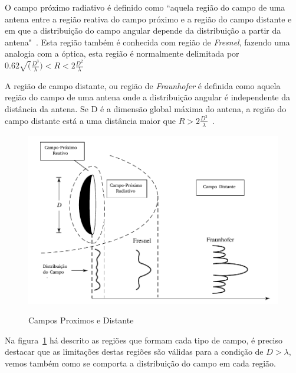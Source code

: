 O campo próximo radiativo é definido como “aquela região do campo de uma antena entre a região reativa do campo próximo e a região do campo distante e em que a distribuição do campo angular depende da distribuição a partir da antena"~\cite[p.~34]{balanis2005}. Esta região também é conhecida com região de \textit{Fresnel}, fazendo uma analogia com a óptica, esta região é normalmente delimitada por $0.62 \sqrt(\frac{D^3}{\lambda}) < R < 2 \frac{D^2}{\lambda}$

A região de campo distante, ou região de \textit{Fraunhofer} é definida como aquela região do campo de uma antena onde a distribuição angular é independente da distância da antena. Se D é a dimensão global máxima do antena, a região do campo distante está a uma distância maior que  $R > 2 \frac{D^2}{\lambda}$~\cite[p.~16]{sivaraman2017}.

\begin{figure}[htb!]
	\centering 
	\caption{Campos Proximos e Distante}
	\includegraphics[scale=0.6]{./img/campos_balanis}
	\label{fig:regions_campos}
\end{figure}

Na figura~\ref{fig:regions_campos} há descrito as regiões que formam cada tipo de campo, é preciso destacar que as limitações destas regiões são válidas para a condição de $D >\lambda$, vemos também como se comporta a distribuição do campo em cada região.


